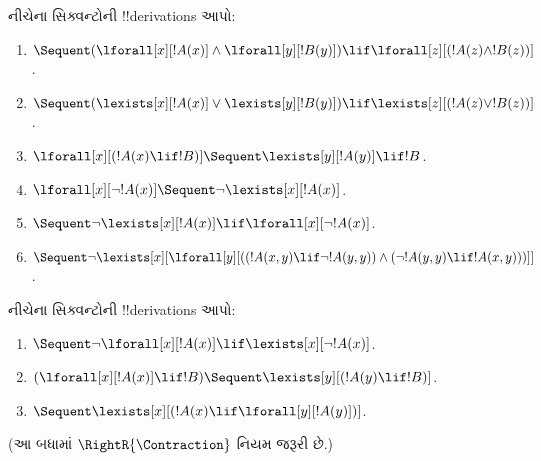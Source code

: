 \documentclass[../../../include/open-logic-section]{subfiles}
\begin{document}
\begin{prob}
નીચેના સિક્વન્ટોની !!{derivation}s આપો:
\begin{enumerate}
\item $\Sequent (\lforall[x][!A(x)] \land \lforall[y][!B(y)]) \lif
\lforall[z][(!A(z) \land !B(z))]$.
\item $\Sequent (\lexists[x][!A(x)] \lor \lexists[y][!B(y)]) \lif
\lexists[z][(!A(z) \lor !B(z))]$.
\item $\lforall[x][(!A(x) \lif !B)] \Sequent \lexists[y][!A(y)] \lif !B$.
\item $\lforall[x][\lnot !A(x)] \Sequent \lnot\lexists[x][!A(x)]$.
\item $\Sequent \lnot\lexists[x][!A(x)] \lif \lforall[x][\lnot !A(x)]$.
\item $\Sequent \lnot\lexists[x][\lforall[y][((!A(x,y) \lif \lnot
!A(y,y)) \land (\lnot !A(y,y) \lif !A(x,y)))]]$.
\end{enumerate}
\end{prob}

\begin{prob}
નીચેના સિક્વન્ટોની !!{derivation}s આપો:
\begin{enumerate}
\item $\Sequent \lnot\lforall[x][!A(x)] \lif \lexists[x][\lnot!A(x)]$.
\item $(\lforall[x][!A(x)] \lif !B) \Sequent \lexists[y][(!A(y) \lif !B)]$.
\item $\Sequent \lexists[x][(!A(x) \lif \lforall[y][!A(y)])]$.
\end{enumerate}
(આ બધામાં $\RightR{\Contraction}$ નિયમ જરૂરી છે.)
\end{prob}
\end{document}

